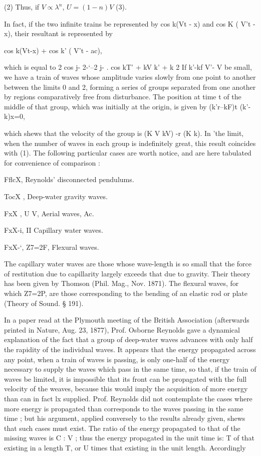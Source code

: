 (2) Thus, if \(V \propto \lambda^n \), \( U = (1-n) V\) (3).

In fact, if the two infinite trains be represented by cos k(Vt - x)
and cos K ( V't - x), their resultant is represented by

cos k(Vt-x) + cos k' ( V't - ac),

which is equal to
 2 cos j- 2-‘--2 j- . cos kT' + kV k' + k 2
If k'-kf V'- V be small, we have a train of waves whose amplitude
varies slowly from one point to another between the limits 0 and 2,
forming a series of groups separated from one another by regions comparatively
free from disturbance. The position at time t of the middle
of that group, which was initially at the origin, is given by
(k'r--kF)t (k'-k)x=0,

which shews that the velocity of the group is (K V  kV) -r (K k).
In 'the limit, when the number of waves in each group is indefinitely
great, this result coincides with (1).  The following particular cases are
worth notice, and are here tabulated for convenience of comparison :

FflcX, Reynolds’ disconnected pendulums.

TocX , Deep-water gravity waves.

FxX , U V, Aerial waves, Ac.

FxX-i, II Capillary water waves.

FxX-‘, Z7=2F, Flexural waves.

The capillary water waves are those whose wave-length is so small
that the force of restitution due to capillarity largely exceeds that due
to gravity. Their theory has been given by Thomson (Phil. Mag., Nov. 1871).
The flexural waves, for which Z7=2P, are those corresponding to the
bending of an elastic rod or plate (Theory of Sound. § 191).

In a paper read at the Plymouth meeting of the British Association
(afterwards printed in Nature, Aug. 23, 1877), Prof. Osborne
Reynolds gave a dynamical explanation of the fact that a group of
deep-water waves advances with only half the rapidity of the individual waves.
It appears that the energy propagated across any point,
when a train of waves is passing, is only one-half of the energy necessary to
supply the waves which pass in the same time, so that, if the
train of waves be limited, it is impossible that its front can be propagated
with the full velocity of the weaves, because this would imply the
acquisition of more energy than can in fact lx supplied. Prof. Reynolds
did not contemplate the cases where more energy is propagated than
corresponds to the waves passing in the same time ; but his argument,
applied conversely to the results already given, shews that such cases
must exist. The ratio of the energy propagated to that of the missing
waves is C : V ; thus the energy propagated in the unit time is: T
of that existing in a length T, or U times that existing in the unit
length. Accordingly

